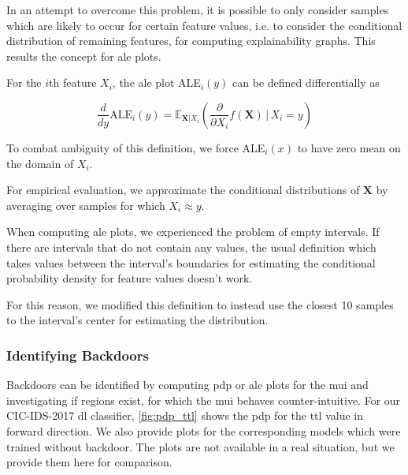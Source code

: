 \documentclass[10pt,sigconf,letterpaper,dvipsnames]{acmart}
\newcommand\note[2]{{\color{#1}#2}}
\newcommand\todo[1]{{\note{red}{TODO: #1}}}
\begin{document}
In an attempt to overcome this problem, it is possible to only consider samples which are likely to occur for certain feature values, i.e. to consider the conditional distribution of remaining features, for computing explainability graphs. This results the concept for \gls{ale} plots.

For the $i$th feature $X_i$, the \gls{ale} plot ALE$_i(y)$ can be defined differentially as



\begin{equation}
\frac{d}{dy} \text{ALE}_i (y) = \mathbb E_{\boldsymbol X | X_i}\left(\frac{\partial}{\partial X_i} f(\boldsymbol X) \, \Big \vert \, X_i=y\right)
\end{equation}

To combat ambiguity of this definition, we force ALE$_i(x)$ to have zero mean on the domain of $X_i$.

For empirical evaluation, we approximate the conditional distributions of $\boldsymbol X$ by averaging over samples for which $X_i \approx y$.

When computing \gls{ale} plots, we experienced the problem of empty intervals. If there are intervals  that do not contain any values, the usual definition which takes values between the interval's boundaries for estimating the conditional probability density for feature values doesn't work.

For this reason, we modified this definition to instead use the closest 10 samples to the interval's center for estimating the distribution.

\subsubsection{Identifying Backdoors}
Backdoors can be identified by computing \gls{pdp} or \gls{ale} plots for the \gls{mui} and investigating if regions exist, for which the \gls{mui} behaves counter-intuitive. For our CIC-IDS-2017 \gls{dl} classifier, \autoref{fig:pdp_ttl} shows the \gls{pdp} for the \gls{ttl} value in forward direction. We also provide plots for the corresponding models which were trained without backdoor. The plots are not available in a real situation, but we provide them here for comparison.
\end{document}
